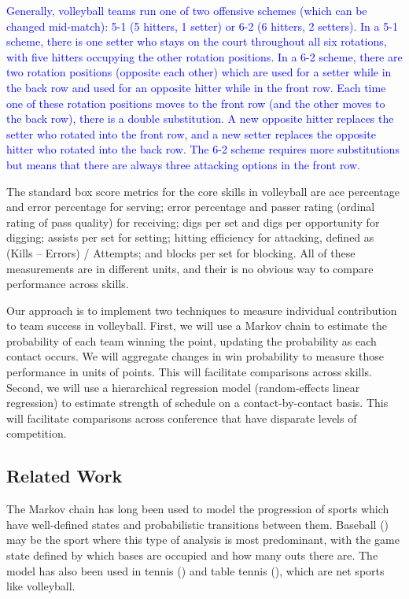 \documentclass[USenglish]{article}
\theoremstyle{dgthm}
\theoremstyle{dgdef}
\begin{document}
\textcolor{blue}{Generally, volleyball teams run one of two offensive schemes (which can be changed mid-match): 5-1 (5 hitters, 1 setter) or 6-2 (6 hitters, 2 setters). In a 5-1 scheme, there is one setter who stays on the court throughout all six rotations, with five hitters occupying the other rotation positions. In a 6-2 scheme, there are two rotation positions (opposite each other) which are used for a setter while in the back row and used for an opposite hitter while in the front row. Each time one of these rotation positions moves to the front row (and the other moves to the back row), there is a double substitution. A new opposite hitter replaces the setter who rotated into the front row, and a new setter replaces the opposite hitter who rotated into the back row. The 6-2 scheme requires more substitutions but means that there are always three attacking options in the front row.}

The standard box score metrics for the core skills in volleyball are ace percentage and error percentage for serving; error percentage and passer rating (ordinal rating of pass quality) for receiving; digs per set and digs per opportunity for digging; assists per set for setting; hitting efficiency for attacking, defined as (Kills -- Errors) / Attempts; and blocks per set for blocking. All of these measurements are in different units, and their is no obvious way to compare performance across skills.

Our approach is to implement two techniques to measure individual contribution to team success in volleyball. First, we will use a Markov chain to estimate the probability of each team winning the point, updating the probability as each contact occurs. We will aggregate changes in win probability to measure those performance in units of points. This will facilitate comparisons across skills. Second, we will use a hierarchical regression model (random-effects linear regression) to estimate strength of schedule on a contact-by-contact basis. This will facilitate comparisons across conference that have disparate levels of competition.


\subsection{Related Work}
\label{sec:related-work}

The Markov chain has long been used to model the progression of sports which have well-defined states and probabilistic transitions between them. Baseball (\cite{bukiet_etal_1997}) may be the sport where this type of analysis is most predominant, with the game state defined by which bases are occupied and how many outs there are. The model has also been used in tennis (\cite{newton_etal_2009}) and table tennis (\cite{pfeiffer_etal_2010}), which are net sports like volleyball.
\end{document}
